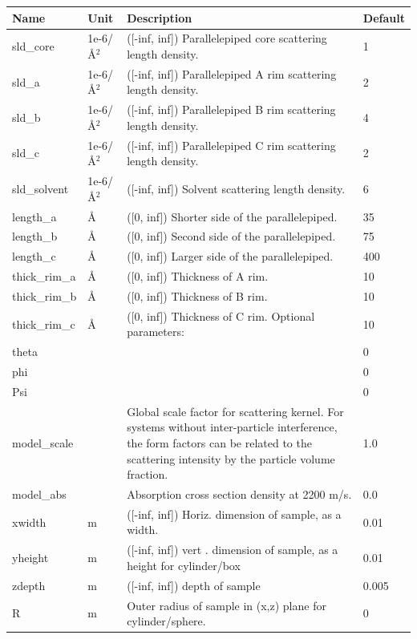 \begin{longtable}{p{}p{}p{}p{}}
\toprule
\textbf{Name} & \textbf{Unit} & \textbf{Description} & \textbf{Default} \\
\midrule
\endhead
sld\_core & 1e-6/\AA{}$^{2}$ & ([-inf, inf]) Parallelepiped core scattering length density. & 1 \\
sld\_a & 1e-6/\AA{}$^{2}$ & ([-inf, inf]) Parallelepiped A rim scattering length density. & 2 \\
sld\_b & 1e-6/\AA{}$^{2}$ & ([-inf, inf]) Parallelepiped B rim scattering length density. & 4 \\
sld\_c & 1e-6/\AA{}$^{2}$ & ([-inf, inf]) Parallelepiped C rim scattering length density. & 2 \\
sld\_solvent & 1e-6/\AA{}$^{2}$ & ([-inf, inf]) Solvent scattering length density. & 6 \\
length\_a & \AA{} & ([0, inf]) Shorter side of the parallelepiped. & 35 \\
length\_b & \AA{} & ([0, inf]) Second side of the parallelepiped. & 75 \\
length\_c & \AA{} & ([0, inf]) Larger side of the parallelepiped. & 400 \\
thick\_rim\_a & \AA{} & ([0, inf]) Thickness of A rim. & 10 \\
thick\_rim\_b & \AA{} & ([0, inf]) Thickness of B rim. & 10 \\
thick\_rim\_c & \AA{} & ([0, inf]) Thickness of C rim. Optional parameters: & 10 \\
theta &  &  & 0 \\
phi &  &  & 0 \\
Psi &  &  & 0 \\
model\_scale &   & Global scale factor for scattering kernel. For systems without inter-particle interference, the form factors can be related to the scattering intensity by the particle volume fraction. & 1.0 \\
model\_abs &   & Absorption cross section density at 2200 m/s. & 0.0 \\
xwidth & m & ([-inf, inf]) Horiz. dimension of sample, as a width. & 0.01 \\
yheight & m & ([-inf, inf]) vert . dimension of sample, as a height for cylinder/box & 0.01 \\
zdepth & m & ([-inf, inf]) depth of sample & 0.005 \\
R & m & Outer radius of sample in (x,z) plane for cylinder/sphere. & 0 \\

\end{longtable}
